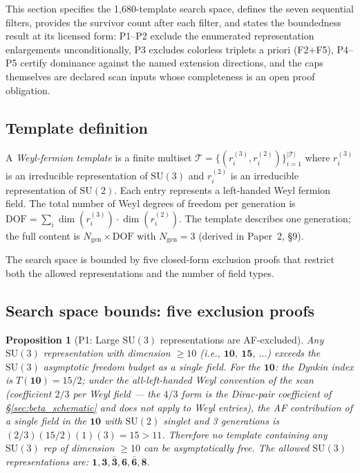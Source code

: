\documentclass[11pt]{article}
\newtheorem{proposition}[theorem]{Proposition}
\theoremstyle{definition}
\newcommand{\SU}{\mathrm{SU}}
\begin{document}
This section specifies the 1{,}680-template search space, defines the
seven sequential filters, provides the survivor count after each
filter, and states the boundedness result at its licensed form:
P1--P2 exclude the enumerated representation enlargements
unconditionally, P3 excludes colorless triplets a priori (F2$+$F5),
P4--P5 certify dominance against the named extension directions, and
the caps themselves are declared scan inputs whose completeness is an
open proof obligation.


\subsection{Template definition}
\label{sec:template_def}

A \emph{Weyl-fermion template} is a finite multiset
$\mathcal{T} = \{(r_i^{(3)}, r_i^{(2)})\}_{i=1}^{|\mathcal{T}|}$
where $r_i^{(3)}$ is an irreducible representation of $\SU(3)$ and
$r_i^{(2)}$ is an irreducible representation of $\SU(2)$.  Each entry
represents a left-handed Weyl fermion field.  The total number of Weyl
degrees of freedom per generation is
$\mathrm{DOF} = \sum_i \dim(r_i^{(3)}) \cdot \dim(r_i^{(2)})$.
The template describes one generation; the full content is
$N_{\mathrm{gen}} \times \mathrm{DOF}$ with $N_{\mathrm{gen}} = 3$
(derived in Paper~2, \S9).

The search space is bounded by five closed-form exclusion proofs that
restrict both the allowed representations and the number of field types.


\subsection{Search space bounds: five exclusion proofs}
\label{sec:exclusion_proofs}

\begin{proposition}[P1: Large $\SU(3)$ representations are AF-excluded]
\label{prop:P1}
Any $\SU(3)$ representation with dimension $\ge 10$ (i.e.,
$\mathbf{10}$, $\mathbf{15}$, $\ldots$) exceeds the $\SU(3)$
asymptotic freedom budget as a single field.  For the $\mathbf{10}$:
the Dynkin index is $T(\mathbf{10}) = 15/2$; under the all-left-handed
Weyl convention of the scan (coefficient $2/3$ per Weyl field --- the
$4/3$ form is the Dirac-pair coefficient of \S\ref{sec:beta_schematic}
and does not apply to Weyl entries), the AF contribution of a single
field in the $\mathbf{10}$ with $\SU(2)$ singlet and 3 generations is
$(2/3)(15/2)(1)(3) = 15 > 11$.
Therefore no template containing any $\SU(3)$ rep of dimension
$\ge 10$ can be asymptotically free.  The allowed $\SU(3)$
representations are: $\mathbf{1}, \mathbf{3}, \bar{\mathbf{3}},
\mathbf{6}, \bar{\mathbf{6}}, \mathbf{8}$.
\end{proposition}
\end{document}
